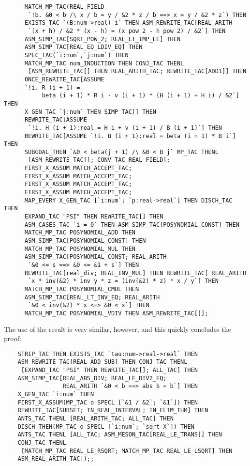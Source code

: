 \documentclass[10pt]{article}
\theoremstyle{definition}
\theoremstyle{remark}
\numberwithin{equation}{section}
\begin{document}
\begin{scriptsize}
\begin{verbatim}
      MATCH_MP_TAC(REAL_FIELD
       `!b. &0 < b /\ x / b = y / &2 * z / b ==> x = y / &2 * z`) THEN
      EXISTS_TAC `(B:num->real) i` THEN ASM_REWRITE_TAC[REAL_ARITH
       `(x + h) / &2 * (x - h) = (x pow 2 - h pow 2) / &2`] THEN
      ASM_SIMP_TAC[SQRT_POW_2; REAL_LT_IMP_LE] THEN
      ASM_SIMP_TAC[REAL_EQ_LDIV_EQ] THEN
      SPEC_TAC(`i:num`,`j:num`) THEN
      MATCH_MP_TAC num_INDUCTION THEN CONJ_TAC THENL
       [ASM_REWRITE_TAC[] THEN REAL_ARITH_TAC; REWRITE_TAC[ADD1]] THEN
      ONCE_REWRITE_TAC[ASSUME
      `!i. R (i + 1) =
           beta (i + 1) * R i - v (i + 1) * (H (i + 1) + H i) / &2`] THEN
      X_GEN_TAC `j:num` THEN SIMP_TAC[] THEN
      REWRITE_TAC[ASSUME
       `!i. H (i + 1):real = H i + v (i + 1) / B (i + 1)`] THEN
      REWRITE_TAC[ASSUME `!i. B (i + 1):real = beta (i + 1) * B i`] THEN
      SUBGOAL_THEN `&0 < beta(j + 1) /\ &0 < B j` MP_TAC THENL
       [ASM_REWRITE_TAC[]; CONV_TAC REAL_FIELD];
      FIRST_X_ASSUM MATCH_ACCEPT_TAC;
      FIRST_X_ASSUM MATCH_ACCEPT_TAC;
      FIRST_X_ASSUM MATCH_ACCEPT_TAC;
      FIRST_X_ASSUM MATCH_ACCEPT_TAC;
      MAP_EVERY X_GEN_TAC [`i:num`; `p:real->real`] THEN DISCH_TAC THEN
      EXPAND_TAC "PSI" THEN REWRITE_TAC[] THEN
      ASM_CASES_TAC `i = 0` THEN ASM_SIMP_TAC[POSYNOMIAL_CONST] THEN
      MATCH_MP_TAC POSYNOMIAL_ADD THEN
      ASM_SIMP_TAC[POSYNOMIAL_CONST] THEN
      MATCH_MP_TAC POSYNOMIAL_MUL THEN
      ASM_SIMP_TAC[POSYNOMIAL_CONST; REAL_ARITH
       `&0 <= s ==> &0 <= &1 + s`] THEN
      REWRITE_TAC[real_div; REAL_INV_MUL] THEN REWRITE_TAC[ REAL_ARITH
       `x * inv(&2) * inv y * z = (inv(&2) * z) * x / y`] THEN
      MATCH_MP_TAC POSYNOMIAL_CMUL THEN
      ASM_SIMP_TAC[REAL_LT_INV_EQ; REAL_ARITH
       `&0 < inv(&2) * x <=> &0 < x`] THEN
      MATCH_MP_TAC POSYNOMIAL_VDIV THEN ASM_REWRITE_TAC[]];
\end{verbatim}\end{scriptsize}

The use of the result is very similar, however, and this quickly concludes
the proof:

\begin{scriptsize}\begin{verbatim}
    STRIP_TAC THEN EXISTS_TAC `tau:num->real->real` THEN
    ASM_REWRITE_TAC[REAL_ADD_SUB] THEN CONJ_TAC THENL
     [EXPAND_TAC "PSI" THEN REWRITE_TAC[]; ALL_TAC] THEN
    ASM_SIMP_TAC[REAL_ABS_DIV; REAL_LE_DIV2_EQ;
                 REAL_ARITH `&0 < b ==> abs b = b`] THEN
    X_GEN_TAC `i:num` THEN
    FIRST_X_ASSUM(MP_TAC o SPECL [`&1 / &2`; `&1`]) THEN
    REWRITE_TAC[SUBSET; IN_REAL_INTERVAL; IN_ELIM_THM] THEN
    ANTS_TAC THENL [REAL_ARITH_TAC; ALL_TAC] THEN
    DISCH_THEN(MP_TAC o SPECL [`i:num`; `sqrt X`]) THEN
    ANTS_TAC THENL [ALL_TAC; ASM_MESON_TAC[REAL_LE_TRANS]] THEN
    CONJ_TAC THENL
     [MATCH_MP_TAC REAL_LE_RSQRT; MATCH_MP_TAC REAL_LE_LSQRT] THEN
    ASM_REAL_ARITH_TAC]);;
\end{verbatim}\end{scriptsize}
\end{document}
